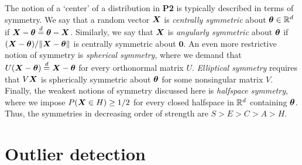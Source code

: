 The notion of a `center' of a distribution in \textbf{P2} is typically
described in terms of symmetry.
We say that a random vector $\bm{X}$ is \emph{centrally symmetric} about
$\bm{\theta} \in \mathbb{R}^d$ if $\bm{X} - \bm{\theta} \overset{d}{=} \bm{\theta} - \bm{X}$.
Similarly, we say that $\bm{X}$ is \emph{angularly symmetric} about $\bm{\theta}$ if
$(\bm{X} - \bm{\theta}) / \Vert \bm{X} - \bm{\theta} \Vert$ is centrally symmetric about $\bm0$.
An even more restrictive notion of symmetry is \emph{spherical symmetry},
where we demand that $U(\bm{X} - \bm{\theta}) \overset{d}{=} \bm{X} - \bm{\theta}$ for every orthonormal
matrix $U$.
\emph{Elliptical symmetry} requires that $V\bm{X}$ is spherically symmetric about
$\bm{\theta}$ for some nonsingular matrix $V$.
Finally, the weakest notions of symmetry discussed here is \emph{halfspace
symmetry}, where we impose $P(\bm{X} \in H) \geq 1/2$ for every closed halfspace
in $\mathbb{R}^d$ containing $\bm{\theta}$.
Thus, the symmetries in decreasing order of strength are $S > E > C > A > H$.












\section{Outlier detection}
